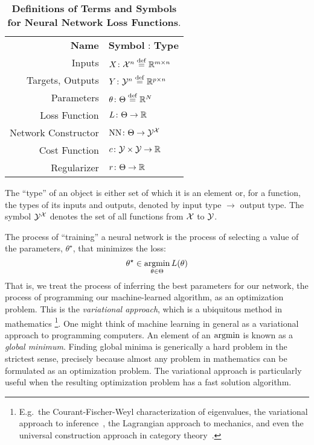 \documentclass[../../thesis.tex]{subfiles}
\begin{document}
\begin{table}[h]
	\begin{center}
		\begin{tabular}{rl}
			\textbf{Name}       & \textbf{Symbol} : \textbf{Type}        \\ %
			Inputs              & $X \colon {\mathcal{X}}^n \stackrel{\small \mathrm{def}}{=} \mathbb{R}^{m\times n}$  \\
			Targets, Outputs    & $Y \colon {\mathcal{Y}}^n \stackrel{\small \mathrm{def}}{=} \mathbb{R}^{p\times n}$  \\
			Parameters          & $\theta \colon \Theta \stackrel{\small \mathrm{def}}{=} \mathbb{R}^N$      \\
			Loss Function       & $L \colon \Theta \to \mathbb{R}$                \\
			Network Constructor & $\mathrm{NN} \colon \Theta \to {\mathcal{Y}}^{\mathcal{X}}$ \\
			Cost Function       & $c \colon {\mathcal{Y}} \times {\mathcal{Y}} \to \mathbb{R}$        \\
			Regularizer         & $r \colon \Theta \to \mathbb{R}$
		\end{tabular}
	\end{center}
	\caption{\textbf{Definitions of Terms and Symbols for Neural Network Loss Functions}.}{%
		The \enquote{type} of an object is either set of which it is an element
		or, for a function, the types of its inputs and outputs,
		denoted by input type $\to$ output type.
		The symbol ${\mathcal{Y}}^{{\mathcal{X}}}$
		denotes the set of all functions from ${\mathcal{X}}$ to ${\mathcal{Y}}$.
	}
\end{table}

The process of \enquote{training} a neural network is the process
of selecting a value of the parameters, $\theta^\star$, that minimizes the loss:
\begin{equation}\equationlabel{minimize}
	\theta^\star \in \argmin_{\theta \in \Theta} L(\theta)
\end{equation}
That is, we treat the process of inferring the best parameters for our network,
the process of programming our machine-learned algorithm,
as an optimization problem.
This is the \emph{variational approach},
which is a ubiquitous method in mathematics%
\footnote{E.g.~the Courant-Fischer-Weyl characterization of eigenvalues,
the variational approach to inference~\cite{wainwright2007},
the Lagrangian approach to mechanics,
and even the universal construction approach in category theory~\cite{milewski2014}.
}.
One might think of machine learning in general as
a variational approach to programming computers.
An element of an $\mathop{\mathrm{argmin}}$ is known as a \emph{global minimum}.
Finding global minima is generically a hard problem in the strictest sense,
precisely because almost any problem in mathematics can be formulated as an
optimization problem.
The variational approach is particularly useful
when the resulting optimization problem
has a fast solution algorithm.
\end{document}

